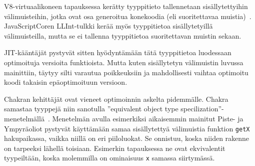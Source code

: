 V8-virtuaalikoneen tapauksessa kerätty tyyppitieto tallennetaan sisällytettyihin välimuisteihin, jotka ovat osa generoitua konekoodia (eli suoritettavaa muistia)~\cite{llint}. JavaScriptCoren LLInt-tulkki kerää myös tyyppitietoa sisällytetyillä välimuisteilla, mutta se ei tallenna tyyppitietoa suoritettavan muistin sekaan.

JIT-kääntäjät pystyvät sitten hyödyntämään tätä tyyppitietoa luodessaan optimoituja versioita funktioista. Mutta kuten sisällytetyn välimuistin luvussa mainittiin, täytyy silti varautua poikkeuksiin ja mahdollisesti vaihtaa optimoitu koodi takaisin epäoptimoituun versioon.

Chakran kehittäjät ovat vieneet optimoinnin askelta pidemmälle. Chakra samastaa tyyppejä niin sanotulla ''equivalent object type specilization''-menetelmällä~\cite{chakra}. Menetelmän avulla esimerkiksi aikaisemmin mainitut Piste- ja Ympyräoliot pystyvät käyttämään samaa sisällytettyä välimuistia funktion \texttt{getX} hakupaikassa, vaikka niillä on eri piiloluokat. Se onnistuu, koska niiden rakenne on tarpeeksi lähellä toisiaan. Esimerkin tapauksessa ne ovat ekvivalentit tyypeiltään, koska molemmilla on ominaisuus \texttt{x} samassa siirtymässä.

\begin{comment}
\begin{itemize}
\item \url{https://wiki.mozilla.org/TypeInference}
\item SpiderMonkey: Staattisen ja dynaamisen päättelyn yhdistelmä!
\item \url{https://trac.webkit.org/wiki/JavaScriptCore#TypeInference}
\end{itemize}
\end{comment}
